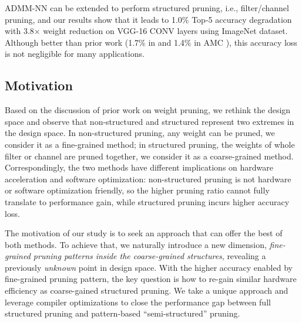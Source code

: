 \documentclass[sigplan,screen]{acmart}
\begin{document}
ADMM-NN can be extended to perform structured 
pruning, i.e., filter/channel pruning, and 
our results show that it 
leads to 1.0\% Top-5 accuracy degradation with 3.8$\times$ weight reduction on VGG-16 CONV layers using ImageNet dataset.
Although better than prior work (1.7\% in {\cite{he2017channel}} and 1.4\% in AMC {\cite{he2018amc}}), this accuracy loss is not negligible for many applications.

































\subsection{Motivation}

Based on the discussion of prior work
on weight pruning, we rethink the design space 
and observe that non-structured and structured 
represent two extremes in the design space.
In non-structured pruning, any weight can be 
pruned, we consider it as a fine-grained method;
in structured pruning, the weights of
whole filter or channel are pruned together,
we consider it as a coarse-grained method. 
Correspondingly, the two methods have different 
implications on hardware acceleration and 
software optimization: non-structured pruning
is not hardware or software optimization 
friendly, so the higher pruning ratio cannot 
fully translate to performance gain, while 
structured pruning incurs higher accuracy loss. 

The motivation of our study is to seek
an approach that can offer the best of both methods. 
To achieve that, 
we naturally introduce a new dimension,
{\em fine-grained 
pruning patterns inside the coarse-grained
structures}, revealing a previously {\em unknown}
point in design space. 
With the higher accuracy enabled by 
fine-grained pruning pattern, the key question is 
how to re-gain similar hardware efficiency 
as coarse-gained structured pruning. 
We take a unique approach and leverage 
compiler optimizations to 
close the performance 
gap between full structured pruning and 
pattern-based ``semi-structured'' pruning.
\end{document}
